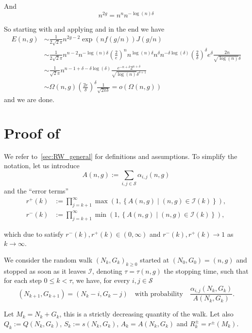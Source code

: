 \documentclass[a4paper,12pt]{article}
\theoremstyle{definition}
\newcommand{\Sij}{\sum_{i,j\in\mathcal S}}
\newcommand{\bigpar}[1]{\left({#1}\right)}
\begin{document}
And
\begin{equation}\label{eee}
n^{2g}=n^nn^{-\log(n)\delta}
\end{equation}

So starting with  and applying  and in the end  we have
\begin{align}
E(n,g)&\sim \frac{1}{2\sqrt 2\pi}n^{2g-2}\exp(nf(g/n))J(g/n)  \\
&\sim\frac{1}{2\sqrt 2\pi}n^{n-2}n^{-\log(n)\delta}\left(\frac 2 e\right)^nn^{\log(n)\delta}n^\delta n^{-\delta\log(\delta)}\left(\frac 2 \delta\right)^\delta e^{\delta}\frac{2n}{\sqrt{\log(n)}\delta}\\
&\sim\frac{1}{\sqrt 2\pi}n^{n-1+\delta-\delta\log(\delta)}\frac{e^{-n+\delta}2^{n+\delta}}{\sqrt{\log(n)}\delta^{\delta+1}}\\
&\sim \Omega(n,g)\bigpar{\frac{2e}{\delta}}^\delta\frac{1}{\sqrt{2\pi\delta}}=o\bigpar{\Omega(n,g)}
\end{align}
and we are done.

\section{Proof of~\label{sec:RW_general_proof}}
We refer to~\cref{sec:RW_general} for definitions and assumptions.
To simplify the notation, let us introduce
\[A(n,g):=\Sij\alpha_{i,j}(n,g)\]
and the ``error terms''
\begin{align*}
    r^{+}(k)&:=\prod_{j=k+1}^{\infty}\max\left(1,\left\{ A(n,g)  \mid (n,g)\in\mathcal I (k) \right\}\right),\\
    r^{-}(k)&:=\prod_{j=k+1}^{\infty}\min(1,\left\{ A(n,g) \mid (n,g)\in\mathcal I (k) \right\}),
\end{align*}

which due to  satisfy $r^{-}(k),r^{+}(k)\in(0,\infty)$ and $r^{-}(k),r^{+}(k)\to 1$ as $k\to\infty$.


We consider the random walk $(N_k,G_k)_{k\geq 0}$ started at $(N_0,G_0)=(n,g)$ and stopped as soon as it leaves $\mathcal I$, denoting $\tau=\tau(n,g)$ the stopping time, such that for each step $0\leq k<\tau$, we have, for every $i,j\in\mathcal S$
\[(N_{k+1},G_{k+1})=(N_{k}-i,G_{k}-j)\quad  \text{with probability} \quad \frac{\alpha_{i,j}(N_k,G_k)}{A(N_k,G_k)}.\]

Let $M_k=N_k+G_k$, this is a strictly decreasing quantity of the walk. Let also $Q_k:=Q(N_k,G_k)$, $S_k:=s(N_k,G_k)$, $A_k=A(N_k,G_k)$ and $R^\pm_k=r^\pm(M_k)$.
\end{document}
